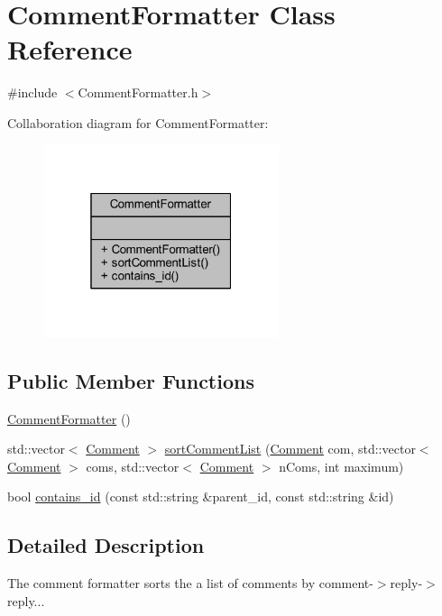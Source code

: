 \hypertarget{class_comment_formatter}{}\section{Comment\+Formatter Class Reference}
\label{class_comment_formatter}


{\ttfamily \#include $<$Comment\+Formatter.\+h$>$}



Collaboration diagram for Comment\+Formatter\+:\nopagebreak
\begin{figure}[H]
\begin{center}
\leavevmode
\includegraphics[width=196pt]{class_comment_formatter__coll__graph}
\end{center}
\end{figure}
\subsection*{Public Member Functions}
\begin{DoxyCompactItemize}
\item 
\hyperlink{class_comment_formatter_a2109e1c890568fbc960c06605d30563e}{Comment\+Formatter} ()
\item 
std\+::vector$<$ \hyperlink{class_comment}{Comment} $>$ \hyperlink{class_comment_formatter_a6a9af9cdde666a914d97c3f45e6c8a49}{sort\+Comment\+List} (\hyperlink{class_comment}{Comment} com, std\+::vector$<$ \hyperlink{class_comment}{Comment} $>$ coms, std\+::vector$<$ \hyperlink{class_comment}{Comment} $>$ n\+Coms, int maximum)
\item 
bool \hyperlink{class_comment_formatter_a3ee22833399687c24694b6e11a3337ba}{contains\+\_\+id} (const std\+::string \&parent\+\_\+id, const std\+::string \&id)
\end{DoxyCompactItemize}


\subsection{Detailed Description}
The comment formatter sorts the a list of comments by comment-\/$>$reply-\/$>$reply... 

